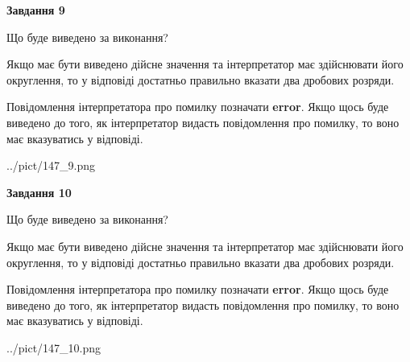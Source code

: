 \documentclass[12pt, ukrainian]{article}
\begin{document}
{\begin {Large}
{\begin {center}\textbf{Завдання 9}\end {center}}\par
Що буде виведено за виконання? \par

Якщо має бути виведено дійсне значення та інтерпретатор має здійснювати його округлення, 
то у відповіді достатньо правильно вказати два дробових розряди.

Повідомлення інтерпретатора про помилку позначати \textbf{error}.
Якщо щось буде виведено до того, як інтерпретатор видасть повідомлення про помилку, 
то воно має вказуватись у відповіді. \par

\begin{center}
	{../pict/147_9.png}
\end{center}
\newpage

{\begin {center}\textbf{Завдання 10}\end {center}}\par
Що буде виведено за виконання? \par

Якщо має бути виведено дійсне значення та інтерпретатор має здійснювати його округлення, 
то у відповіді достатньо правильно вказати два дробових розряди.

Повідомлення інтерпретатора про помилку позначати \textbf{error}.
Якщо щось буде виведено до того, як інтерпретатор видасть повідомлення про помилку, 
то воно має вказуватись у відповіді. \par

\begin{center}
	{../pict/147_10.png}
\end{center}
\newpage

\end {Large}}
\end{document}
